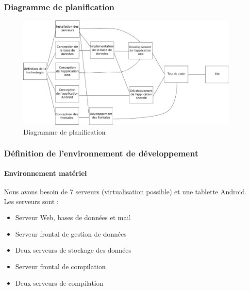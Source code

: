 \documentclass[a4paper,12pt]{article}
\begin{document}
\subsubsection{Diagramme de planification}
\begin{figure}[!ht]
\begin {center}
\includegraphics[width=1\textwidth,angle=90]{./Diagramme/mpm.pdf}
\end{center}
\label{MPM}
\caption{Diagramme de planification}
\end{figure}
\newpage

\subsubsection{Définition de l'environnement de développement}

\paragraph*{Environnement matériel\\} 
Nous avons besoin de 7 serveurs (virtualisation possible) et une tablette Android. Les serveurs sont :
\begin{itemize}
 \item Serveur Web, bases de données et mail
 \item Serveur frontal de gestion de données
 \item Deux serveurs de stockage des données
 \item Serveur frontal de compilation
 \item Deux serveurs de compilation
\end{itemize}
\end{document}
